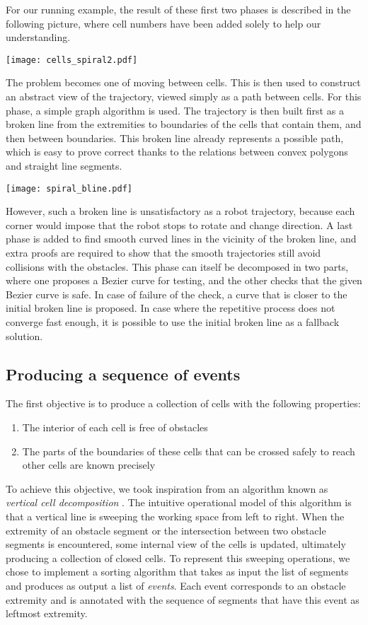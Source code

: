 \documentclass{easychair}
\begin{document}
For our running example, the result of these first two phases is
described in the following picture, where cell numbers have been added
solely to help our understanding.
\begin{center}
\texttt{[image: cells\_spiral2.pdf]}
\end{center}
The problem becomes one
of moving between cells. This
is then used to construct an abstract view of the trajectory, viewed simply
as a path between cells.  For this phase, a
simple graph algorithm is used.  The trajectory is
then built first as a broken line from the extremities to boundaries
of the cells that contain them, and then between boundaries.  This
broken line already represents a possible path, which is easy to prove correct
thanks to the relations between convex polygons and straight line segments.
\begin{center}
\texttt{[image: spiral\_bline.pdf]}
\end{center}
However, such a broken line is unsatisfactory
as a robot trajectory, because each corner would impose that the robot
stops to rotate and change direction.  A last phase is added to find
smooth curved lines in the vicinity of the broken line, and extra proofs are
required to show that the smooth trajectories still avoid collisions with
the obstacles.  This phase can itself be decomposed in two parts, where one
proposes a Bezier curve for testing, and the other checks that the given
Bezier curve is safe.  In case of failure of the check, a curve that is closer
to the initial broken line is proposed.  In case where the repetitive process
does not converge fast enough, it is possible to use the initial broken line as
a fallback solution.

\subsection{Producing a sequence of events}
The first objective is to produce a collection of cells with the following
properties:
\begin{enumerate}
\item The interior of each cell is free of obstacles
\item The parts of the boundaries of these cells that can be crossed
  safely to reach other cells are known precisely
\end{enumerate}
To achieve this objective, we took inspiration from an algorithm known as
{\em vertical cell decomposition} \cite{Latombe91}.  The intuitive
operational model of this algorithm is that a vertical line is
sweeping the working space from left to right.  When the extremity of
an obstacle segment or the intersection between two obstacle segments
is encountered, some internal view of the cells is updated, ultimately
producing a collection of closed cells.  To represent this sweeping
operations, we chose to implement a sorting algorithm that takes as
input the list of segments and produces as output a list of {\em
  events}.  Each event corresponds to an obstacle extremity and is
annotated with the sequence of segments that have this event as
leftmost extremity.
\end{document}
